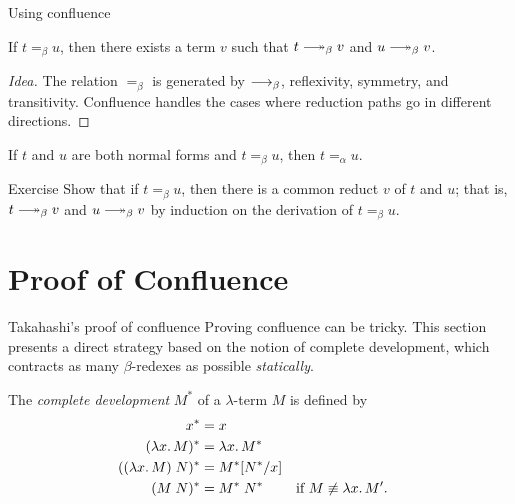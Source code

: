\begin{frame}{Using confluence}
  \begin{proposition}
    If $t =_\beta u$, then there exists a term $v$ such that
    $t \reduce v$ and $u \reduce v$.
  \end{proposition}

  \begin{proof}[Idea]
    The relation $=_\beta$ is generated by $\longrightarrow_{\beta}$, reflexivity, symmetry,
    and transitivity. Confluence handles the cases where reduction paths go in
    different directions.
  \end{proof}

  \vfill

  \begin{corollary}
    If $t$ and $u$ are both normal forms and $t =_\beta u$, then
    $t =_\alpha u$.
  \end{corollary}
\end{frame}

\begin{frame}{Exercise}
  Show that if $t =_\beta u$, then there is a common reduct $v$ of $t$ and $u$;
  that is, $t \reduce v$ and $u \reduce v$ by induction on the derivation of $t =_\beta u$.
\end{frame}

\appendix

\section{Proof of Confluence}

\begin{frame}{Takahashi's proof of confluence}
  Proving confluence can be tricky. This section presents a direct strategy
  based on the notion of complete development, which contracts as many
  $\beta$-redexes as possible \emph{statically}.

  The \emph{complete development} $M^*$ of a $\lambda$-term $M$ is defined by
  \begin{align*}
    x^* &= x \\
    (\lambda x.\,M)^* &= \lambda x.\,M^* \\
    ((\lambda x.\,M)\;N)^* &= M^*[{N^*}/{x}] \\
    (M\;N)^* &= M^*\;N^* && \text{if $M \not\equiv \lambda x.\,M'$}.
  \end{align*}
\end{frame}

